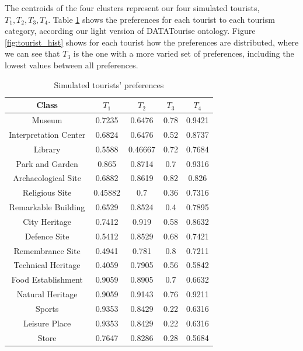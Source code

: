 The centroids of the four clusters represent our four simulated tourists, $T_1, T_2, T_3, T_4$. Table \ref{table:centroids} shows the preferences for each tourist to each tourism category, according our light version of DATATourise ontology.  Figure \ref{fig:tourist_hist} shows for each tourist how the preferences are distributed, where we can see that $T_3$ is the one with a more varied set of preferences, including the lowest values between all preferences.

\begin{table}[h!]
\vspace{-0.3cm}
\footnotesize{
\centering
\caption{Simulated tourists' preferences}
\label{table:centroids}
\vspace{-0.3cm}
\begin{tabular}{ |c|c|c|c|c| } 
    \hline
    Class & $T_1$ & $T_2$ & $T_3$ & $T_4$ \\
    \hline
    \hline

    Museum & 0.7235 & 0.6476 & 0.78 & 0.9421 \\ 
    \hline
    Interpretation Center & 0.6824 & 0.6476 & 0.52 & 0.8737 \\
    \hline
    Library & 0.5588 & 0.46667 & 0.72 & 0.7684 \\
    \hline
    Park and Garden & 0.865 & 0.8714 & 0.7 & 0.9316 \\
    \hline
    Archaeological Site & 0.6882 & 0.8619 & 0.82 & 0.826 \\
    \hline
    Religious Site & 0.45882 & 0.7 & 0.36 & 0.7316 \\
    \hline
    Remarkable Building & 0.6529 & 0.8524 & 0.4 & 0.7895 \\
    \hline
    City Heritage & 0.7412 & 0.919 & 0.58 & 0.8632 \\
    \hline
    Defence Site & 0.5412 & 0.8529 & 0.68 & 0.7421 \\
    \hline
    Remembrance Site & 0.4941 & 0.781 & 0.8 & 0.7211 \\
    \hline
    Technical Heritage & 0.4059 & 0.7905 & 0.56 & 0.5842 \\
    \hline
    Food Establishment & 0.9059 & 0.8905 & 0.7 & 0.6632 \\
    \hline
    Natural Heritage & 0.9059 & 0.9143 & 0.76 & 0.9211 \\
    \hline
    Sports & 0.9353 & 0.8429 & 0.22 & 0.6316 \\
    \hline
    Leisure Place & 0.9353 & 0.8429 & 0.22 & 0.6316 \\
    \hline
    Store & 0.7647 & 0.8286 & 0.28 & 0.5684 \\
    
    \hline
\end{tabular}
}
\vspace{-0.3cm}
\end{table}

